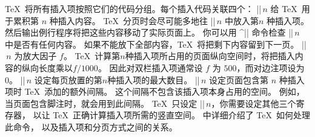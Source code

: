 \TeX\ 将所有插入项按照它们的代码分组。每个插入代码关联四个：
\ulist
\li |\box|$\,n$ 给 \TeX\ 用于累积第 $n$ 种插入内容。
\TeX\ 分页时会尽可能多地往 |\box|$\,n$ 中放入第$n$ 种插入项。
然后输出例行程序将把这些内容移动了实际页面上。
你可以用 ^|\ifvoid| 命令\ctsref{\@ifvoid}检查 |\box|$\,n$ 中是否有任何内容。
如果不能放下全部内容，\TeX\ 将把剩下内容留到下一页。
\li |\count|$\,n$ 为放大因子 $f$。
\TeX\ 计算第$n$种插入项所占用的页面纵向空间时，将把插入内容的纵向长度乘以$f/1000$。
因此对双栏插入项通常设 $f$ 为 $500$，而对边注项设为 $0$。
\li |\dimen|$\,n$ 设定每页放置的第$n$种插入项的最大数目。
\li |\skip|$\,n$ 设定页面包含第 $n$ 种插入项时 \TeX\ 添加的额外间隔。
这个间隔不包含该插入项本身占用的空间。
例如，当页面包含脚注时，就会用到此间隔。
\endulist
\noindent
\TeX\ 只设定 |\box|$\,n$，你需要设定其他三个寄存器，
以让 \TeX\ 正确计算插入项所需的竖直空间。
 中详细介绍了 \TeX\ 如何处理此命令，
以及插入项和分页方式之间的关系。
\enddesc

